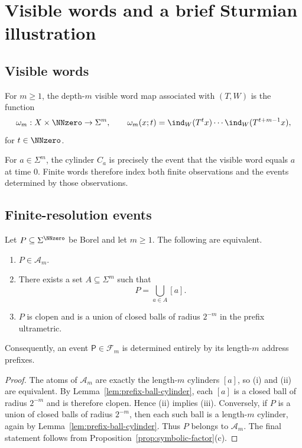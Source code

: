 \section{Visible words and a brief Sturmian illustration}\label{sec:spg}

\subsection{Visible words}

\begin{definition}\label{def:visible-word-map}
For \(m\ge 1\), the depth-\(m\) visible word map associated with
\((T,W)\) is the function
\[
  \omega_m:X\times\NNzero\to\Sigma^m,
  \qquad
  \omega_m(x;t)=\ind_W(T^t x)\cdots \ind_W(T^{t+m-1}x),
\]
for \(t\in\NNzero\).
\end{definition}

For \(a\in\Sigma^m\), the cylinder \(C_a\) is precisely the event that
the visible word equals \(a\) at time \(0\).  Finite words therefore
index both finite observations and the events determined by those
observations.

\subsection{Finite-resolution events}

\begin{proposition}\label{prop:decidable-clopen}
Let $P\subseteq\Sigma^{\NNzero}$ be Borel and let $m\ge 1$. The following are
equivalent.
\begin{enumerate}[label=(\roman*)]
  \item $P\in\mathcal{A}_m$.
  \item There exists a set $A\subseteq\Sigma^m$ such that
  \[
    P=\bigcup_{a\in A}[a].
  \]
  \item $P$ is clopen and is a union of closed balls of radius $2^{-m}$ in the
  prefix ultrametric.
\end{enumerate}
Consequently, an event $\mathsf{P}\in\mathcal{F}_m$ is determined entirely by
its length-$m$ address prefixes.
\end{proposition}

\begin{proof}
The atoms of $\mathcal{A}_m$ are exactly the length-$m$ cylinders $[a]$, so (i)
and (ii) are equivalent.
By Lemma~\ref{lem:prefix-ball-cylinder}, each $[a]$ is a closed ball of radius
$2^{-m}$ and is therefore clopen. Hence (ii) implies (iii).
Conversely, if $P$ is a union of closed balls of radius $2^{-m}$, then each
such ball is a length-$m$ cylinder, again by
Lemma~\ref{lem:prefix-ball-cylinder}. Thus $P$ belongs to $\mathcal{A}_m$.
The final statement follows from Proposition~\ref{prop:symbolic-factor}(c).
\end{proof}

